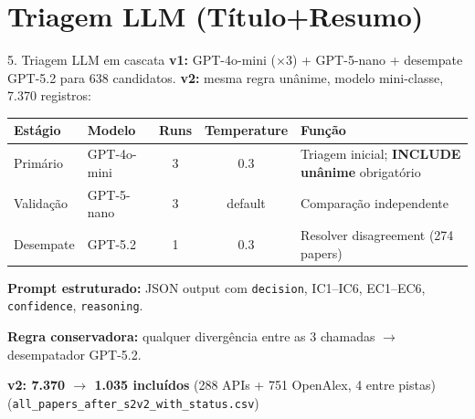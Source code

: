 \documentclass[aspectratio=169]{beamer}
\begin{document}
\section{Triagem LLM (Título+Resumo)}
\begin{frame}{5. Triagem LLM em cascata}
\small
\textbf{v1:} GPT-4o-mini ($\times$3) + GPT-5-nano + desempate GPT-5.2 para 638 candidatos. \textbf{v2:} mesma regra unânime, modelo mini-classe, 7.370 registros:

\begin{table}
\centering
\begin{tabular}{>{\raggedright\arraybackslash}p{2.4cm} >{\raggedright\arraybackslash}p{2.8cm} c c >{\raggedright\arraybackslash}p{4.5cm}}
\toprule
\textbf{Estágio} & \textbf{Modelo} & \textbf{Runs} & \textbf{Temperature} & \textbf{Função} \\
\midrule
Primário & GPT-4o-mini & 3 & 0.3 & Triagem inicial; \textbf{INCLUDE unânime} obrigatório \\
Validação & GPT-5-nano & 3 & default & Comparação independente \\
Desempate & GPT-5.2 & 1 & 0.3 & Resolver disagreement (274 papers) \\
\bottomrule
\end{tabular}
\end{table}

\textbf{Prompt estruturado:} JSON output com \texttt{decision}, IC1--IC6, EC1--EC6, \texttt{confidence}, \texttt{reasoning}.

\textbf{Regra conservadora:} qualquer divergência entre as 3 chamadas $\to$ desempatador GPT-5.2.

\centering
\textbf{v2: 7.370 $\to$ 1.035 incluídos} (288 APIs + 751 OpenAlex, 4 entre pistas) \quad (\texttt{all\_papers\_after\_s2v2\_with\_status.csv})
\end{frame}

\end{document}
